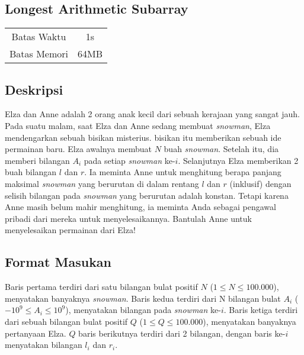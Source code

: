 \documentclass{article}
\begin{document}
\begin{center}
    \section*{Longest Arithmetic Subarray} %

    \begin{tabular}{ | c c | }
        \hline
        Batas Waktu  & 1s \\    %
        Batas Memori & 64MB \\  %
        \hline
    \end{tabular}
\end{center}

\subsection*{Deskripsi}

Elza dan Anne adalah 2 orang anak kecil dari sebuah kerajaan yang sangat jauh.
Pada suatu malam, saat Elza dan Anne sedang membuat \textit{snowman}, Elza mendengarkan sebuah bisikan misterius.
bisikan itu memberikan sebuah ide permainan baru. Elza awalnya membuat $N$ buah \textit{snowman}.
Setelah itu, dia memberi bilangan $A_i$ pada setiap \textit{snowman} ke-$i$.
Selanjutnya Elza memberikan 2 buah bilangan $l$ dan $r$. Ia meminta Anne untuk menghitung berapa panjang maksimal 
\textit{snowman} yang berurutan di dalam rentang $l$ dan $r$ (inklusif) dengan selisih bilangan pada \textit{snowman} yang 
berurutan adalah konstan. Tetapi karena Anne masih belum mahir menghitung, 
ia meminta Anda sebagai pengawal pribadi dari mereka untuk menyelesaikannya.
Bantulah Anne untuk menyelesaikan permainan dari Elza!

\subsection*{Format Masukan}

Baris pertama terdiri dari satu bilangan bulat positif $N$ ($1 \leq N \leq 100.000$), menyatakan banyaknya \textit{snowman}.
Baris kedua terdiri dari N bilangan bulat $A_i$ ($-10^{9} \leq A_i \leq 10^{9}$), menyatakan bilangan pada \textit{snowman} ke-$i$.
Baris ketiga terdiri dari sebuah bilangan bulat positif $Q$ ($1 \leq Q \leq 100.000$), menyatakan banyaknya pertanyaan Elza.
$Q$ baris berikutnya terdiri dari 2 bilangan, dengan baris ke-$i$ menyatakan bilangan $l_i$ dan $r_i$.
\end{document}
